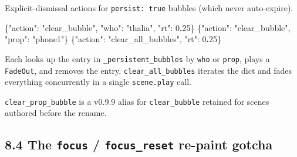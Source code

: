 \documentclass[
  12pt,
  letterpaper,
]{book}
\newenvironment{Shaded}{}{}
\newcommand{\DataTypeTok}[1]{\textcolor[rgb]{0.56,0.13,0.00}{#1}}
\newcommand{\DecValTok}[1]{\textcolor[rgb]{0.25,0.63,0.44}{#1}}
\newcommand{\ErrorTok}[1]{\textcolor[rgb]{1.00,0.00,0.00}{\textbf{#1}}}
\newcommand{\FunctionTok}[1]{\textcolor[rgb]{0.02,0.16,0.49}{#1}}
\newcommand{\StringTok}[1]{\textcolor[rgb]{0.25,0.44,0.63}{#1}}
\begin{document}
Explicit-dismissal actions for \texttt{persist:\ true} bubbles (which
never auto-expire).

\begin{Shaded}
\begin{Highlighting}[]
\FunctionTok{\{}\DataTypeTok{"action"}\FunctionTok{:} \StringTok{"clear\_bubble"}\FunctionTok{,} \DataTypeTok{"who"}\FunctionTok{:} \StringTok{"thalia"}\FunctionTok{,} \DataTypeTok{"rt"}\FunctionTok{:} \DecValTok{0}\ErrorTok{.}\DecValTok{25}\FunctionTok{\}}
\FunctionTok{\{}\DataTypeTok{"action"}\FunctionTok{:} \StringTok{"clear\_bubble"}\FunctionTok{,} \DataTypeTok{"prop"}\FunctionTok{:} \StringTok{"phone1"}\FunctionTok{\}}
\FunctionTok{\{}\DataTypeTok{"action"}\FunctionTok{:} \StringTok{"clear\_all\_bubbles"}\FunctionTok{,} \DataTypeTok{"rt"}\FunctionTok{:} \DecValTok{0}\ErrorTok{.}\DecValTok{25}\FunctionTok{\}}
\end{Highlighting}
\end{Shaded}

Each looks up the entry in \texttt{\_persistent\_bubbles} by
\texttt{who} or \texttt{prop}, plays a \texttt{FadeOut}, and removes the
entry. \texttt{clear\_all\_bubbles} iterates the dict and fades
everything concurrently in a single \texttt{scene.play} call.

\texttt{clear\_prop\_bubble} is a v0.9.9 alias for
\texttt{clear\_bubble} retained for scenes authored before the rename.


\subsection{\texorpdfstring{8.4 The \texttt{focus} / \texttt{focus\_reset}
re-paint gotcha}{8.4 The focus / focus\_reset re-paint
gotcha}}\label{the-focus_reset-overlay-gotcha}
\end{document}
